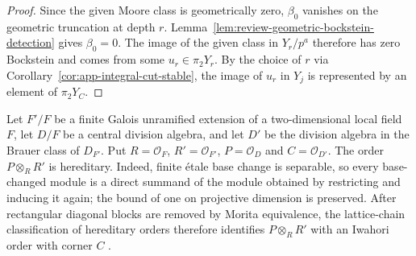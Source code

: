 \begin{proof}
Since the given Moore class is geometrically zero, $\beta_0$ vanishes on the geometric truncation at depth $r$.
Lemma~\ref{lem:review-geometric-bockstein-detection} gives $\beta_0=0$.
The image of the given class in $Y_r/p^a$ therefore has zero Bockstein and comes from some $u_r\in\pi_2Y_r$.
By the choice of $r$ via Corollary~\ref{cor:app-integral-cut-stable}, the image of $u_r$ in $Y_j$ is represented by an element of $\pi_2Y_C$.
\end{proof}

Let $F'/F$ be a finite Galois unramified extension of a two-dimensional local field $F$, let $D/F$ be a central division algebra, and let $D'$ be the division algebra in the Brauer class of $D_{F'}$.
Put $R=\mathcal O_F$, $R'=\mathcal O_{F'}$, $P=\mathcal O_D$ and $C=\mathcal O_{D'}$.
The order $P\otimes_RR'$ is hereditary.
Indeed, finite \'etale base change is separable, so every base-changed module is a direct summand of the module obtained by restricting and inducing it again; the bound of one on projective dimension is preserved.
After rectangular diagonal blocks are removed by Morita equivalence, the lattice-chain classification of hereditary orders therefore identifies $P\otimes_RR'$ with an Iwahori order with corner $C$ \cite[Chapter 9]{ReinerMaximalOrders}.

